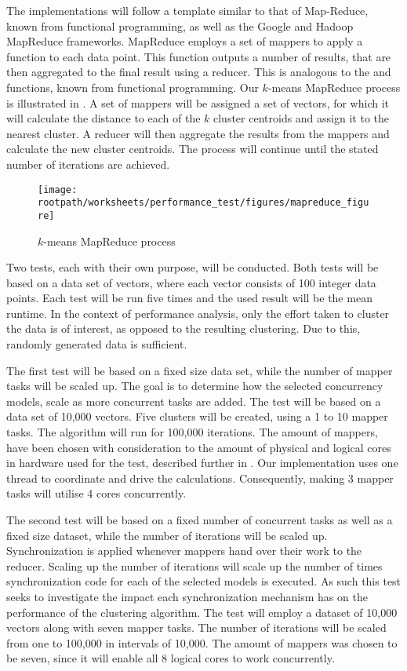 The implementations will follow a template similar to that of Map-Reduce\cite{dean2008mapreduce}, known from functional programming, as well as the Google and Hadoop MapReduce frameworks. MapReduce employs a set of mappers to apply a function to each data point. This function outputs a number of results, that are then aggregated to the final result using a reducer. This is analogous to the  and  functions, known from functional programming. Our $k$-means MapReduce process is illustrated in . A set of mappers will be assigned a set of vectors, for which it will calculate the distance to each of the $k$ cluster centroids and assign it to the nearest cluster. A reducer will then aggregate the results from the mappers and calculate the new cluster centroids. The process will continue until the stated number of iterations are achieved.

\begin{figure}[ht!]
\centering
\texttt{[image: \\rootpath/worksheets/performance\_test/figures/mapreduce\_figure]}
\caption{$k$-means MapReduce process}\label{fig:kmeans_mapreduce}
\end{figure}

Two tests, each with their own purpose, will be conducted. Both tests will be based on a data set of vectors, where each vector consists of 100 integer data points. Each test will be run five times and the used result will be the mean runtime. In the context of performance analysis, only the effort taken to cluster the data is of interest, as opposed to the resulting clustering. Due to this, randomly generated data is sufficient.

The first test will be based on a fixed size data set, while the number of mapper tasks will be scaled up. The goal is to determine how the selected concurrency models, scale as more concurrent tasks are added. The test will be based on a data set of 10,000 vectors. Five clusters will be created, using a 1 to 10 mapper tasks. The algorithm will run for 100,000 iterations. The amount of mappers, have been chosen with consideration to the amount of physical and logical cores in hardware used for the test, described further in . Our implementation uses one thread to coordinate and drive the calculations. Consequently, making 3 mapper tasks will utilise 4 cores concurrently.

The second test will be based on a fixed number of concurrent tasks as well as a fixed size dataset, while the number of iterations will be scaled up.  Synchronization is applied whenever mappers hand over their work to the reducer. Scaling up the number of iterations will scale up the number of times synchronization code for each of the selected models is executed. As such this test seeks to investigate the impact each synchronization mechanism has on the performance of the clustering algorithm. The test will employ a dataset of 10,000 vectors along with seven mapper tasks. The number of iterations will be scaled from one to 100,000 in intervals of 10,000. The amount of mappers was chosen to be seven, since it will enable all 8 logical cores to work concurrently.

